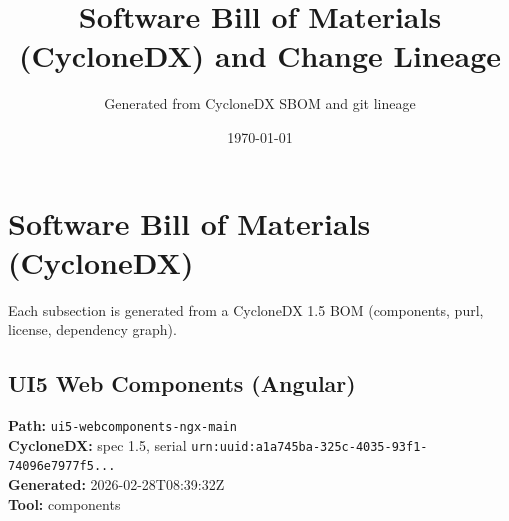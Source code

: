 \documentclass[11pt]{article}
\title{Software Bill of Materials (CycloneDX) and Change Lineage}
\author{Generated from CycloneDX SBOM and git lineage}
\date{\today}
\begin{document}
\maketitle
\tableofcontents
\newpage
\section{Software Bill of Materials (CycloneDX)}
Each subsection is generated from a CycloneDX 1.5 BOM (components, purl, license, dependency graph).

\subsection{UI5 Web Components (Angular)}
\textbf{Path:} \texttt{ui5-webcomponents-ngx-main}
\\ \textbf{CycloneDX:} spec 1.5, serial \texttt{urn:uuid:a1a745ba-325c-4035-93f1-74096e7977f5...}
\\ \textbf{Generated:} 2026-02-28T08:39:32Z
\\ \textbf{Tool:} components
\end{document}
